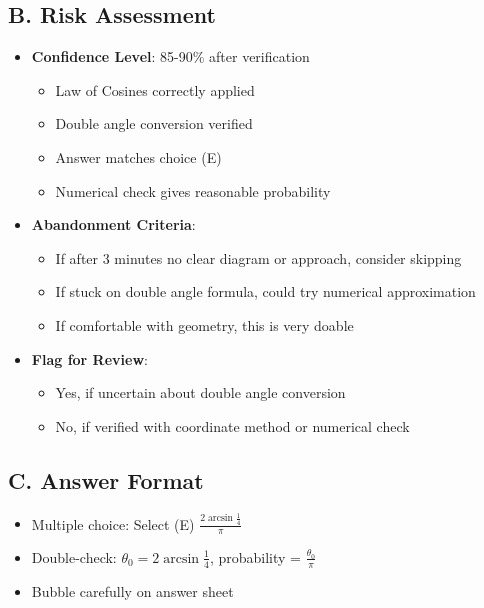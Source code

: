 \documentclass[12pt]{article}
\begin{document}
\begin{competitionbox}
\subsection*{B. Risk Assessment}
\begin{itemize}[leftmargin=*]
    \item \textbf{Confidence Level}: 85-90\% after verification
    \begin{itemize}
        \item Law of Cosines correctly applied
        \item Double angle conversion verified
        \item Answer matches choice (E)
        \item Numerical check gives reasonable probability
    \end{itemize}
    \item \textbf{Abandonment Criteria}: 
    \begin{itemize}
        \item If after 3 minutes no clear diagram or approach, consider skipping
        \item If stuck on double angle formula, could try numerical approximation
        \item If comfortable with geometry, this is very doable
    \end{itemize}
    \item \textbf{Flag for Review}: 
    \begin{itemize}
        \item Yes, if uncertain about double angle conversion
        \item No, if verified with coordinate method or numerical check
    \end{itemize}
\end{itemize}

\subsection*{C. Answer Format}
\begin{itemize}[leftmargin=*]
    \item Multiple choice: Select (E) $\frac{2\arcsin \frac{1}{4}}{\pi}$
    \item Double-check: $\theta_0 = 2\arcsin\frac{1}{4}$, probability = $\frac{\theta_0}{\pi}$ \checkmark
    \item Bubble carefully on answer sheet
\end{itemize}
\end{competitionbox}
\end{document}
